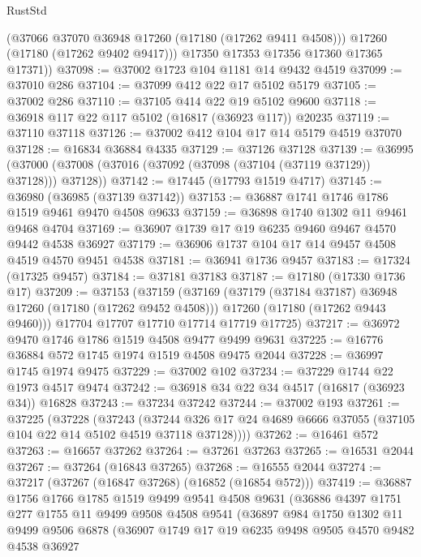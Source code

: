 \begin{lexlean}{RustStd}
\begin{coremodule}
{\begin{coremodule}
{{{{{{{{{{{{{{{{{{{{{{{{{{{{{{{{{{{{{{{{{{{{{{{{{{{{{{{          (@37066 @37070 @36948 @17260 (@17180 (@17262 @9411 @4508)))
          @17260
          (@17180 (@17262 @9402 @9417)))
        @17350
        @17353
        @17356
        @17360
        @17365
        @17371))
@37098 := @37002 @1723 @104 @1181 @14 @9432 @4519
@37099 := @37010 @286
@37104 := @37099 @412 @22 @17 @5102 @5179
@37105 := @37002 @286
@37110 := @37105 @414 @22 @19 @5102 @9600
@37118 := @36918 @117 @22 @117 @5102 (@16817 (@36923 @117)) @20235
@37119 := @37110 @37118
@37126 := @37002 @412 @104 @17 @14 @5179 @4519 @37070
@37128 := @16834 @36884 @4335
@37129 := @37126 @37128
@37139 := @36995 (@37000 (@37008 (@37016 (@37092 (@37098 (@37104 (@37119 @37129)) @37128))) @37128))
@37142 := @17445 (@17793 @1519 @4717)
@37145 := @36980 (@36985 (@37139 @37142))
@37153 := @36887 @1741 @1746 @1786 @1519 @9461 @9470 @4508 @9633
@37159 := @36898 @1740 @1302 @11 @9461 @9468 @4704
@37169 := @36907 @1739 @17 @19 @6235 @9460 @9467 @4570 @9442 @4538 @36927
@37179 := @36906 @1737 @104 @17 @14 @9457 @4508 @4519 @4570 @9451 @4538
@37181 := @36941 @1736 @9457
@37183 := @17324 (@17325 @9457)
@37184 := @37181 @37183
@37187 := @17180 (@17330 @1736 @17)
@37209 := @37153
    (@37159
      (@37169
        (@37179 (@37184 @37187) @36948 @17260 (@17180 (@17262 @9452 @4508)))
        @17260
        (@17180 (@17262 @9443 @9460)))
      @17704
      @17707
      @17710
      @17714
      @17719
      @17725)
@37217 := @36972 @9470 @1746 @1786 @1519 @4508 @9477 @9499 @9631
@37225 := @16776 @36884 @572 @1745 @1974 @1519 @4508 @9475 @2044
@37228 := @36997 @1745 @1974 @9475
@37229 := @37002 @102
@37234 := @37229 @1744 @22 @1973 @4517 @9474
@37242 := @36918 @34 @22 @34 @4517 (@16817 (@36923 @34)) @16828
@37243 := @37234 @37242
@37244 := @37002 @193
@37261 := @37225
    (@37228
      (@37243
        (@37244 @326 @17 @24 @4689 @6666 @37055 (@37105 @104 @22 @14 @5102 @4519 @37118 @37128))))
@37262 := @16461 @572
@37263 := @16657 @37262
@37264 := @37261 @37263
@37265 := @16531 @2044
@37267 := @37264 (@16843 @37265)
@37268 := @16555 @2044
@37274 := @37217 (@37267 (@16847 @37268) (@16852 (@16854 @572)))
@37419 := @36887
    @1756
    @1766
    @1785
    @1519
    @9499
    @9541
    @4508
    @9631
    (@36886
      @4397
      @1751
      @277
      @1755
      @11
      @9499
      @9508
      @4508
      @9541
      (@36897
        @984
        @1750
        @1302
        @11
        @9499
        @9506
        @6878
        (@36907
          @1749
          @17
          @19
          @6235
          @9498
          @9505
          @4570
          @9482
          @4538
          @36927
}}}}}}}}}}}}}}}}}}}}}}}}}}}}}}}}}}}}}}}}}}}}}}}}}}}}}}}
\end{coremodule}}
\end{coremodule}
\end{lexlean}
